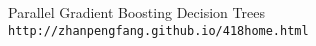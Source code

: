 \documentclass[a4paper,11pt]{book}
\begin{document}
\begin{thebibliography}{1}
Parallel Gradient Boosting Decision Trees
\\\texttt{http://zhanpengfang.github.io/418home.html}


\end{thebibliography}


%
%
%

%
%
%
\chapter*{}
\thispagestyle{empty}
\end{document}
